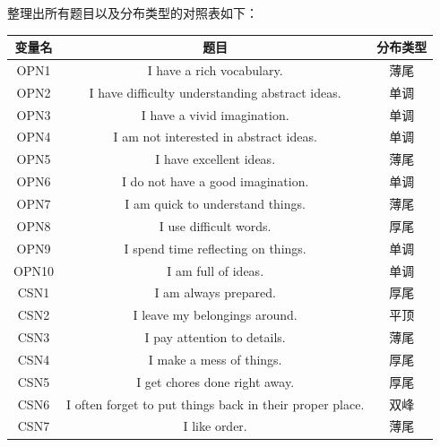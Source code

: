 \documentclass[UTF8]{ctexart}
\begin{document}
整理出所有题目以及分布类型的对照表如下：
\begin{longtable}{c|c|c}
  \hline
  \textbf{变量名} & \textbf{题目}                                              & \textbf{分布类型} \\\hline
  OPN1         & I have a rich vocabulary.                                & 薄尾            \\\hline
  OPN2         & I have difficulty understanding abstract ideas.          & 单调            \\\hline
  OPN3         & I have a vivid imagination.                              & 单调            \\\hline
  OPN4         & I am not interested in abstract ideas.                   & 单调            \\\hline
  OPN5         & I have excellent ideas.                                  & 薄尾            \\\hline
  OPN6         & I do not have a good imagination.                        & 单调            \\\hline
  OPN7         & I am quick to understand things.                         & 薄尾            \\\hline
  OPN8         & I use difficult words.                                   & 厚尾            \\\hline
  OPN9         & I spend time reflecting on things.                       & 单调            \\\hline
  OPN10        & I am full of ideas.                                      & 单调            \\\hline
  CSN1         & I am always prepared.                                    & 厚尾            \\\hline
  CSN2         & I leave my belongings around.                            & 平顶            \\\hline
  CSN3         & I pay attention to details.                              & 薄尾            \\\hline
  CSN4         & I make a mess of things.                                 & 厚尾            \\\hline
  CSN5         & I get chores done right away.                            & 厚尾            \\\hline
  CSN6         & I often forget to put things back in their proper place. & 双峰            \\\hline
  CSN7         & I like order.                                            & 薄尾            \\\hline

\end{longtable}
\end{document}

